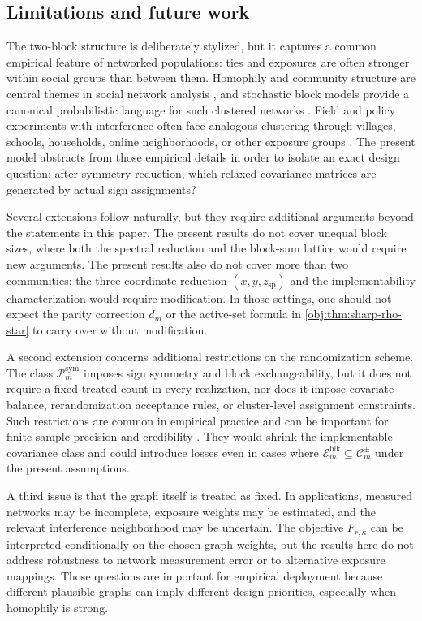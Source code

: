 \documentclass[11pt]{article}
\begin{document}
\subsection{Limitations and future work}

The two-block structure is deliberately stylized, but it captures a common empirical feature of networked populations: ties and exposures are often stronger within social groups than between them. Homophily and community structure are central themes in social network analysis \citep{mcpherson2001,newman2002}, and stochastic block models provide a canonical probabilistic language for such clustered networks \citep{holland1983,abbe2017}. Field and policy experiments with interference often face analogous clustering through villages, schools, households, online neighborhoods, or other exposure groups \citep{banerjee2013,baird2018,ugander2020,li2021}. The present model abstracts from those empirical details in order to isolate an exact design question: after symmetry reduction, which relaxed covariance matrices are generated by actual sign assignments?

Several extensions follow naturally, but they require additional arguments beyond the statements in this paper. The present results do not cover unequal block sizes, where both the spectral reduction and the block-sum lattice would require new arguments. The present results also do not cover more than two communities; the three-coordinate reduction \((x,y,z_{\mathrm{sp}})\) and the implementability characterization would require modification. In those settings, one should not expect the parity correction \(d_m\) or the active-set formula in \cref{obj:thm:sharp-rho-star} to carry over without modification.

A second extension concerns additional restrictions on the randomization scheme. The class \(\mathcal P_m^{\mathrm{sym}}\) imposes sign symmetry and block exchangeability, but it does not require a fixed treated count in every realization, nor does it impose covariate balance, rerandomization acceptance rules, or cluster-level assignment constraints. Such restrictions are common in empirical practice and can be important for finite-sample precision and credibility \citep{savje2021,zigler2018}. They would shrink the implementable covariance class and could introduce losses even in cases where \(\mathcal E_m^{\mathrm{blk}}\subseteq\mathcal C_m^{\pm}\) under the present assumptions.

A third issue is that the graph itself is treated as fixed. In applications, measured networks may be incomplete, exposure weights may be estimated, and the relevant interference neighborhood may be uncertain. The objective \(F_{r,\kappa}\) can be interpreted conditionally on the chosen graph weights, but the results here do not address robustness to network measurement error or to alternative exposure mappings. Those questions are important for empirical deployment because different plausible graphs can imply different design priorities, especially when homophily is strong.
\end{document}
